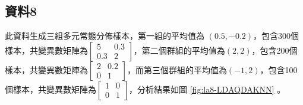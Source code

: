 \documentclass[12pt, a4paper]{article}
\begin{document}
\subsection{資料8}
此資料生成三組多元常態分佈樣本，第一組的平均值為 $(0.5, -0.2)$，包含300個樣本，共變異數矩陣為$\begin{bmatrix}5 & 0.3 \\0.3 & 2 \end{bmatrix}$，第二個群組的平均值為$(2, 2)$，包含200個樣本，共變異數矩陣為$\begin{bmatrix}2 & 0.2 \\0 & 1 \end{bmatrix}$，而第三個群組的平均值為$(-1, 2)$，包含100個樣本，共變異數矩陣為$\begin{bmatrix}1 & 0 \\0 & 1 \end{bmatrix}$，分析結果如圖 \ref{fig:la8-LDAQDAKNN} 。
\end{document}
